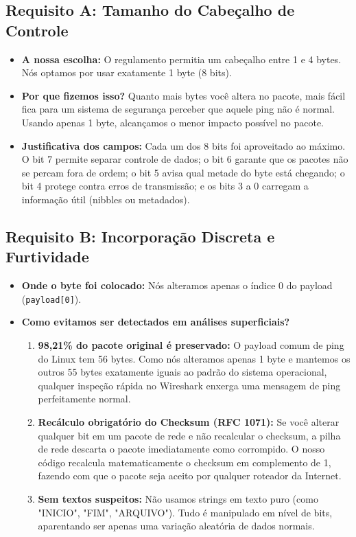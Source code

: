 \documentclass[12pt,a4paper]{article}
\begin{document}
\subsection{Requisito A: Tamanho do Cabeçalho de Controle}
\begin{itemize}[leftmargin=*]
    \item \textbf{A nossa escolha:} O regulamento permitia um cabeçalho entre 1 e 4 bytes. Nós optamos por usar exatamente 1 byte (8 bits).
    \item \textbf{Por que fizemos isso?} Quanto mais bytes você altera no pacote, mais fácil fica para um sistema de segurança perceber que aquele ping não é normal. Usando apenas 1 byte, alcançamos o menor impacto possível no pacote.
    \item \textbf{Justificativa dos campos:} Cada um dos 8 bits foi aproveitado ao máximo. O bit 7 permite separar controle de dados; o bit 6 garante que os pacotes não se percam fora de ordem; o bit 5 avisa qual metade do byte está chegando; o bit 4 protege contra erros de transmissão; e os bits 3 a 0 carregam a informação útil (nibbles ou metadados).
\end{itemize}

\subsection{Requisito B: Incorporação Discreta e Furtividade}
\begin{itemize}[leftmargin=*]
    \item \textbf{Onde o byte foi colocado:} Nós alteramos apenas o índice 0 do payload (\texttt{payload[0]}).
    \item \textbf{Como evitamos ser detectados em análises superficiais?}
    \begin{enumerate}
        \item \textbf{98,21\% do pacote original é preservado:} O payload comum de ping do Linux tem 56 bytes. Como nós alteramos apenas 1 byte e mantemos os outros 55 bytes exatamente iguais ao padrão do sistema operacional, qualquer inspeção rápida no Wireshark enxerga uma mensagem de ping perfeitamente normal.
        \item \textbf{Recálculo obrigatório do Checksum (RFC 1071):} Se você alterar qualquer bit em um pacote de rede e não recalcular o checksum, a pilha de rede descarta o pacote imediatamente como corrompido. O nosso código recalcula matematicamente o checksum em complemento de 1, fazendo com que o pacote seja aceito por qualquer roteador da Internet.
        \item \textbf{Sem textos suspeitos:} Não usamos strings em texto puro (como "INICIO", "FIM", "ARQUIVO"). Tudo é manipulado em nível de bits, aparentando ser apenas uma variação aleatória de dados normais.
    \end{enumerate}
\end{itemize}
\end{document}
